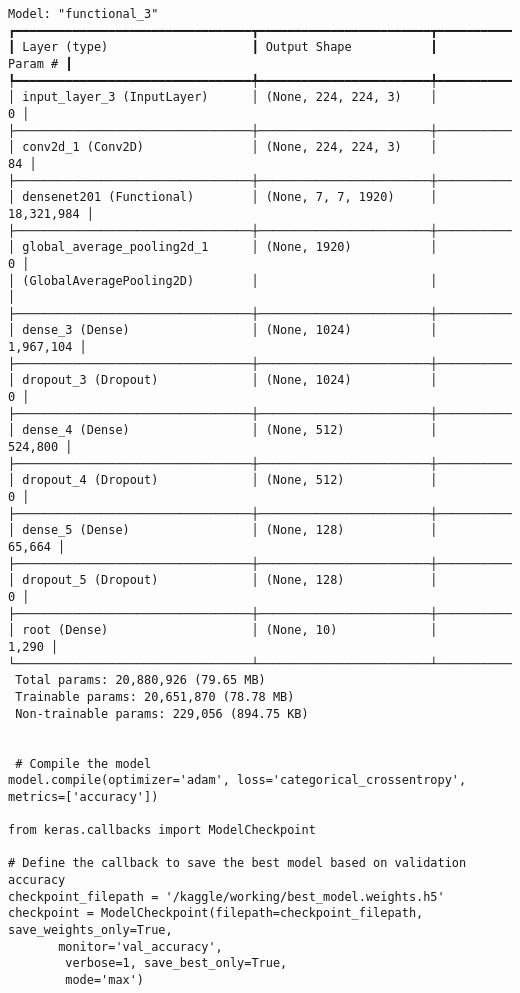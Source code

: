 \documentclass[12pt, English]{article}
\begin{document}
\begin{normalsize}
\begin{verbatim}
Model: "functional_3"
┏━━━━━━━━━━━━━━━━━━━━━━━━━━━━━━━━━┳━━━━━━━━━━━━━━━━━━━━━━━━┳━━━━━━━━━━━━━━━┓
┃ Layer (type)                    ┃ Output Shape           ┃       Param # ┃
┡━━━━━━━━━━━━━━━━━━━━━━━━━━━━━━━━━╇━━━━━━━━━━━━━━━━━━━━━━━━╇━━━━━━━━━━━━━━━┩
│ input_layer_3 (InputLayer)      │ (None, 224, 224, 3)    │             0 │
├─────────────────────────────────┼────────────────────────┼───────────────┤
│ conv2d_1 (Conv2D)               │ (None, 224, 224, 3)    │            84 │
├─────────────────────────────────┼────────────────────────┼───────────────┤
│ densenet201 (Functional)        │ (None, 7, 7, 1920)     │    18,321,984 │
├─────────────────────────────────┼────────────────────────┼───────────────┤
│ global_average_pooling2d_1      │ (None, 1920)           │             0 │
│ (GlobalAveragePooling2D)        │                        │               │
├─────────────────────────────────┼────────────────────────┼───────────────┤
│ dense_3 (Dense)                 │ (None, 1024)           │     1,967,104 │
├─────────────────────────────────┼────────────────────────┼───────────────┤
│ dropout_3 (Dropout)             │ (None, 1024)           │             0 │
├─────────────────────────────────┼────────────────────────┼───────────────┤
│ dense_4 (Dense)                 │ (None, 512)            │       524,800 │
├─────────────────────────────────┼────────────────────────┼───────────────┤
│ dropout_4 (Dropout)             │ (None, 512)            │             0 │
├─────────────────────────────────┼────────────────────────┼───────────────┤
│ dense_5 (Dense)                 │ (None, 128)            │        65,664 │
├─────────────────────────────────┼────────────────────────┼───────────────┤
│ dropout_5 (Dropout)             │ (None, 128)            │             0 │
├─────────────────────────────────┼────────────────────────┼───────────────┤
│ root (Dense)                    │ (None, 10)             │         1,290 │
└─────────────────────────────────┴────────────────────────┴───────────────┘
 Total params: 20,880,926 (79.65 MB)
 Trainable params: 20,651,870 (78.78 MB)
 Non-trainable params: 229,056 (894.75 KB)


 # Compile the model
model.compile(optimizer='adam', loss='categorical_crossentropy', metrics=['accuracy'])

from keras.callbacks import ModelCheckpoint

# Define the callback to save the best model based on validation accuracy
checkpoint_filepath = '/kaggle/working/best_model.weights.h5'
checkpoint = ModelCheckpoint(filepath=checkpoint_filepath, save_weights_only=True, 
       monitor='val_accuracy', 
        verbose=1, save_best_only=True,
        mode='max')


\end{verbatim}
\end{normalsize}
\end{document}
